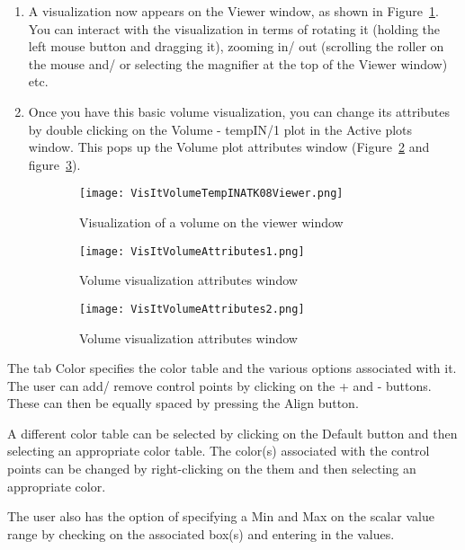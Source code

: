 \begin{enumerate}
\item A visualization now appears on the Viewer window, as shown in
  Figure~\ref{VisItVolumeTempINATK08Viewer}. You can interact with the
  visualization in terms of rotating it (holding the left mouse button
  and dragging it), zooming in/ out (scrolling the roller on the mouse
  and/ or selecting the magnifier at the top of the Viewer window)
  etc.


\item Once you have this basic volume visualization, you can change
  its attributes by double clicking on the Volume - tempIN/1 plot in
  the Active plots window. This pops up the Volume plot attributes
  window (Figure~\ref{VisItVolumeAttributes1} and
  figure~\ref{VisItVolumeAttributes2}).

\end{enumerate}


\begin{figure}[htb]
  \centering
  \begin{subfigure}[b]{0.3\textwidth}
    \texttt{[image: VisItVolumeTempINATK08Viewer.png]}
    \caption{Visualization of a volume on the viewer window}
    \label{VisItVolumeTempINATK08Viewer}
  \end{subfigure}
  \begin{subfigure}[b]{0.3\textwidth}
    \texttt{[image: VisItVolumeAttributes1.png]}
    \caption{Volume visualization attributes window}
    \label{VisItVolumeAttributes1}
  \end{subfigure}
  \begin{subfigure}[b]{0.3\textwidth}
    \texttt{[image: VisItVolumeAttributes2.png]}
    \caption{Volume visualization attributes window}
    \label{VisItVolumeAttributes2}
  \end{subfigure}
  \caption{}
  \label{ucf.fig5}
\end{figure}

The tab Color specifies the color table and the various options
associated with it. The user can add/ remove control points by
clicking on the + and - buttons. These can then be equally spaced by
pressing the Align button.

A different color table can be selected by clicking on the Default
button and then selecting an appropriate color table. The color(s)
associated with the control points can be changed by right-clicking on
the them and then selecting an appropriate color.

The user also has the option of specifying a Min and Max on the scalar
value range by checking on the associated box(s) and entering in the
values.

